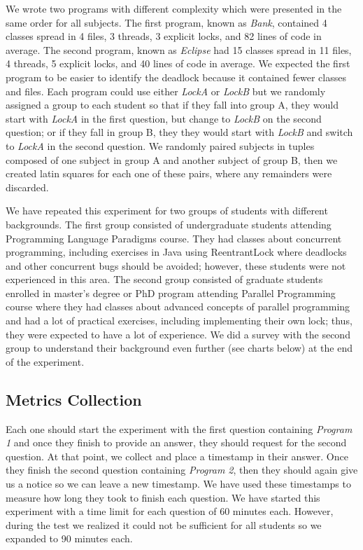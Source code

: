 We wrote two programs with different complexity which were presented in the same order for all subjects. The first program, known as \emph{Bank}, contained 4 classes spread in 4 files, 3 threads, 3 explicit locks, and 82 lines of code in average. The second program, known as \emph{Eclipse} had 15 classes spread in 11 files, 4 threads, 5 explicit locks, and 40 lines of code in average. We expected the first program to be easier to identify the deadlock because it contained fewer classes and files. Each program could use either \emph{LockA} or \emph{LockB} but we randomly assigned a group to each student so that if they fall into group A, they would start with \emph{LockA} in the first question, but change to \emph{LockB} on the second question; or if they fall in group B, they they would start with \emph{LockB} and switch to \emph{LockA} in the second question. We randomly paired subjects in tuples composed of one subject in group A and another subject of group B, then we created latin squares for each one of these pairs, where any remainders were discarded.


We have repeated this experiment for two groups of students with different backgrounds. The first group consisted of undergraduate students attending Programming Language Paradigms course. They had classes about concurrent programming, including exercises in Java using ReentrantLock where deadlocks and other concurrent bugs should be avoided; however, these students were not experienced in this area. The second group consisted of graduate students enrolled in master's degree or PhD program attending Parallel Programming course where they had classes about advanced concepts of parallel programming and had a lot of practical exercises, including implementing their own lock; thus, they were expected to have a lot of experience. We did a survey with the second group to understand their background even further (see charts below) at the end of the experiment.


\subsection{Metrics Collection}

Each one should start the experiment with the first question containing \emph{Program 1} and once they finish to provide an answer, they should request for the second question. At that point, we collect and place a timestamp in their answer. Once they finish the second question containing \emph{Program 2}, then they should again give us a notice so we can leave a new timestamp. We have used these timestamps to measure how long they took to finish each question. We have started this experiment with a time limit for each question of 60 minutes each. However, during the test we realized it could not be sufficient for all students so we expanded to 90 minutes each.

